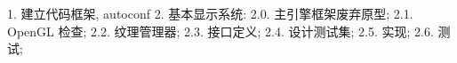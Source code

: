 1. 建立代码框架, autoconf
2. 基本显示系统:
2.0. 主引擎框架废弃原型;
2.1. OpenGL 检查;
2.2. 纹理管理器;
2.3. 接口定义;
2.4. 设计测试集;
2.5. 实现;
2.6. 测试;

